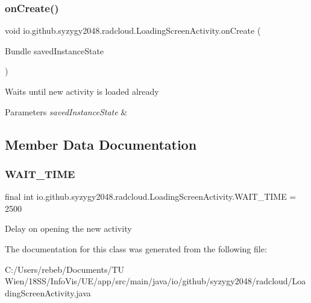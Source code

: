 \subsubsection{\texorpdfstring{on\+Create()}{onCreate()}}
{\footnotesize\ttfamily void io.\+github.\+syzygy2048.\+radcloud.\+Loading\+Screen\+Activity.\+on\+Create (\begin{DoxyParamCaption}\item[{Bundle}]{saved\+Instance\+State }\end{DoxyParamCaption})\hspace{0.3cm}{\ttfamily [protected]}}

Waits until new activity is loaded already 
\begin{DoxyParams}{Parameters}
{\em saved\+Instance\+State} & \\
\hline
\end{DoxyParams}


\subsection{Member Data Documentation}
\mbox{\label{classio_1_1github_1_1syzygy2048_1_1radcloud_1_1_loading_screen_activity_a8dc1db6478b13139cebca00f957738fd}} 
\subsubsection{\texorpdfstring{W\+A\+I\+T\+\_\+\+T\+I\+ME}{WAIT\_TIME}}
{\footnotesize\ttfamily final int io.\+github.\+syzygy2048.\+radcloud.\+Loading\+Screen\+Activity.\+W\+A\+I\+T\+\_\+\+T\+I\+ME = 2500\hspace{0.3cm}{\ttfamily [private]}}

Delay on opening the new activity 

The documentation for this class was generated from the following file\+:\begin{DoxyCompactItemize}
\item 
C\+:/\+Users/rebeb/\+Documents/\+T\+U Wien/18\+S\+S/\+Info\+Vis/\+U\+E/app/src/main/java/io/github/syzygy2048/radcloud/Loading\+Screen\+Activity.\+java\end{DoxyCompactItemize}
